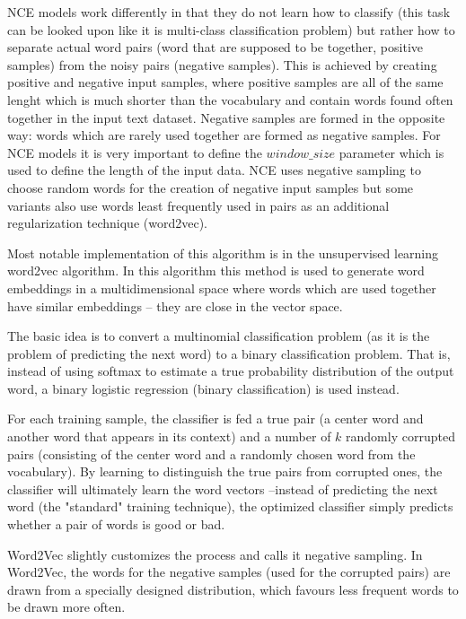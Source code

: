 \documentclass[b5paper]{book}
\begin{document}
NCE models work differently in that they do not learn how to classify (this task can be looked upon like it is multi-class classification problem) but rather how to separate actual word pairs (word that are supposed to be together, positive samples) from the noisy pairs (negative samples). This is achieved by creating positive and negative input samples, where positive samples are all of the same lenght which is much shorter than the vocabulary and contain words found often together in the input text dataset. Negative samples are formed in the opposite way: words which are rarely used together are formed as negative samples. For NCE models it is very important to define the \(window\_size\) parameter which is used to define the length of the input data. NCE uses negative sampling to choose random words for the creation of negative input samples but some variants also use words least frequently used in pairs as an additional regularization technique (word2vec).

Most notable implementation of this algorithm is in the unsupervised learning word2vec algorithm. In this algorithm this method is used to generate word embeddings in a multidimensional space where words which are used together have similar embeddings -- they are close in the vector space. 

The basic idea is to convert a multinomial classification problem (as it is the problem of predicting the next word) to a binary classification problem. That is, instead of using softmax to estimate a true probability distribution of the output word, a binary logistic regression (binary classification) is used instead.

For each training sample, the classifier is fed a true pair (a center word and another word that appears in its context) and a number of \(k\) randomly corrupted pairs (consisting of the center word and a randomly chosen word from the vocabulary). By learning to distinguish the true pairs from corrupted ones, the classifier will ultimately learn the word vectors --instead of predicting the next word (the "standard" training technique), the optimized classifier simply predicts whether a pair of words is good or bad.

Word2Vec slightly customizes the process and calls it negative sampling. In Word2Vec, the words for the negative samples (used for the corrupted pairs) are drawn from a specially designed distribution, which favours less frequent words to be drawn more often.
\end{document}
